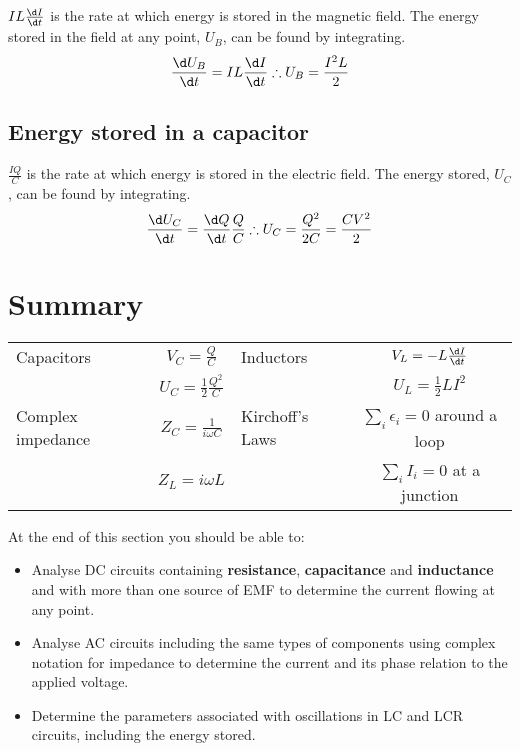 \documentclass[
]{book}
\theoremstyle{definition}
\theoremstyle{definition}
\theoremstyle{definition}
\theoremstyle{definition}
\theoremstyle{remark}
\begin{document}
\(IL \frac{\d I}{\d t}\) is the rate at which energy is stored in the
magnetic field. The energy stored in the field at any point, \(U_B\), can
be found by integrating.
\[\frac{\d U_B}{\d t} = IL \frac{\d I}{\d t} \therefore U_B = \frac{I^2 L}{2}\]

\hypertarget{energy-stored-in-a-capacitor}{%
\subsection{Energy stored in a capacitor}\label{energy-stored-in-a-capacitor}}

\(\frac{IQ}{C}\) is the rate at which energy is stored in the electric
field. The energy stored, \(U_C\), can be found by integrating.
\[\begin{aligned}
\frac{\d U_C}{\d t} = \frac{\d Q}{\d t} \frac{Q}{C} \therefore U_C = \frac{Q^2}{2C} = \frac{CV^2}{2}
\end{aligned}\]

\hypertarget{summary-1}{%
\section{Summary}\label{summary-1}}

\protect\hypertarget{tab:summary}{}{}

\begin{longtable}[]{@{}lclc@{}}
\toprule\noalign{}
\endhead
\bottomrule\noalign{}
\endlastfoot
Capacitors & \(V_C = \frac{Q}{C}\) & Inductors & \(V_L = -L \frac{\d I}{\d t}\) \\
& \(U_C = \frac{1}{2} \frac{Q^2}{C}\) & & \(U_L = \frac{1}{2} LI^2\) \\
Complex impedance & \(Z_C = \frac{1}{i \omega C}\) & Kirchoff's Laws & \(\sum_i \epsilon_i = 0\) around a loop \\
& \(Z_L = i \omega L\) & & \(\sum_i I_i = 0\) at a junction \\
\end{longtable}

At the end of this section you should be able to:

\begin{itemize}
\item
  Analyse DC circuits containing \textbf{resistance}, \textbf{capacitance} and
  \textbf{inductance} and with more than one source of EMF to determine the
  current flowing at any point.
\item
  Analyse AC circuits including the same types of components using
  complex notation for impedance to determine the current and its
  phase relation to the applied voltage.
\item
  Determine the parameters associated with oscillations in LC and LCR
  circuits, including the energy stored.
\end{itemize}
\end{document}
